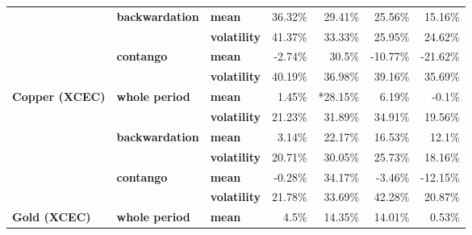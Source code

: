 \documentclass[
  authoryear,
  preprint,
  3p]{elsarticle}
\begin{document}
\begin{longtable}[t]{>{}l>{}l>{}l>{}r>{}r>{}r>{}r}
\addlinespace
\textbf{} & \textbf{backwardation} & \textbf{mean} & \textcolor[HTML]{4285f4}{36.32\%} & \textcolor[HTML]{4285f4}{29.41\%} & \textcolor[HTML]{4285f4}{25.56\%} & \textcolor[HTML]{4285f4}{15.16\%}\\
\textbf{} & \textbf{} & \textbf{volatility} & \textcolor[HTML]{4285f4}{41.37\%} & \textcolor[HTML]{4285f4}{33.33\%} & \textcolor[HTML]{4285f4}{25.95\%} & \textcolor[HTML]{4285f4}{24.62\%}\\
\textbf{} & \textbf{contango} & \textbf{mean} & \textcolor[HTML]{4285f4}{-2.74\%} & \textcolor[HTML]{4285f4}{30.5\%} & \textcolor[HTML]{4285f4}{-10.77\%} & \textcolor[HTML]{4285f4}{-21.62\%}\\
\textbf{} & \textbf{} & \textbf{volatility} & \textcolor[HTML]{4285f4}{40.19\%} & \textcolor[HTML]{4285f4}{36.98\%} & \textcolor[HTML]{4285f4}{39.16\%} & \textcolor[HTML]{4285f4}{35.69\%}\\
\textbf{Copper (XCEC)} & \textbf{whole period} & \textbf{mean} & \textcolor[HTML]{4285f4}{1.45\%} & \textcolor[HTML]{4285f4}{*28.15\%} & \textcolor[HTML]{4285f4}{6.19\%} & \textcolor[HTML]{4285f4}{-0.1\%}\\
\addlinespace
\textbf{} & \textbf{} & \textbf{volatility} & \textcolor[HTML]{4285f4}{21.23\%} & \textcolor[HTML]{4285f4}{31.89\%} & \textcolor[HTML]{4285f4}{34.91\%} & \textcolor[HTML]{4285f4}{19.56\%}\\
\textbf{} & \textbf{backwardation} & \textbf{mean} & \textcolor[HTML]{4285f4}{3.14\%} & \textcolor[HTML]{4285f4}{22.17\%} & \textcolor[HTML]{4285f4}{16.53\%} & \textcolor[HTML]{4285f4}{12.1\%}\\
\textbf{} & \textbf{} & \textbf{volatility} & \textcolor[HTML]{4285f4}{20.71\%} & \textcolor[HTML]{4285f4}{30.05\%} & \textcolor[HTML]{4285f4}{25.73\%} & \textcolor[HTML]{4285f4}{18.16\%}\\
\textbf{} & \textbf{contango} & \textbf{mean} & \textcolor[HTML]{4285f4}{-0.28\%} & \textcolor[HTML]{4285f4}{34.17\%} & \textcolor[HTML]{4285f4}{-3.46\%} & \textcolor[HTML]{4285f4}{-12.15\%}\\
\textbf{} & \textbf{} & \textbf{volatility} & \textcolor[HTML]{4285f4}{21.78\%} & \textcolor[HTML]{4285f4}{33.69\%} & \textcolor[HTML]{4285f4}{42.28\%} & \textcolor[HTML]{4285f4}{20.87\%}\\
\addlinespace
\textbf{Gold (XCEC)} & \textbf{whole period} & \textbf{mean} & \textcolor[HTML]{4285f4}{4.5\%} & \textcolor[HTML]{4285f4}{14.35\%} & \textcolor[HTML]{4285f4}{14.01\%} & \textcolor[HTML]{4285f4}{0.53\%}\\

\end{longtable}
\end{document}
